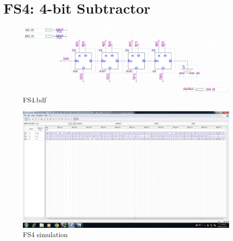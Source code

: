 \documentclass[12pt,a4paper]{article}
\begin{document}
  \section{FS4: 4-bit Subtractor}
  \begin{figure}[H]
    \centering
    \includegraphics[width=\linewidth]{FS4_bdf.png}
    \caption{FS4.bdf}
  \end{figure}
  \begin{figure}[H]
    \centering
    \includegraphics[width=\linewidth]{FS4_simulation.png}
    \caption{FS4 simulation}
  \end{figure}
\end{document}
